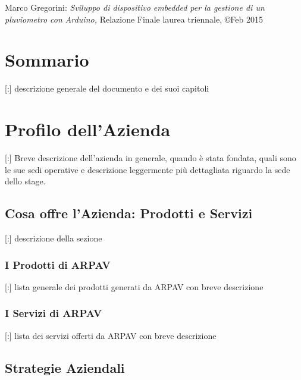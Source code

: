 \documentclass[11pt]{book}              %
\begin{document}
\newpage
\thispagestyle{empty}
\vspace*{\fill}

Marco Gregorini: \textit{Sviluppo di dispositivo embedded per la gestione di un pluviometro con Arduino,} Relazione Finale laurea triennale, \copyright Feb 2015

\newpage

\chapter{Sommario}
[:] descrizione generale del documento e dei suoi capitoli
                          

\newpage
\thispagestyle{empty}

\tableofcontents    

\newpage
\thispagestyle{empty}

                  
\mainmatter       
  

\chapter{Profilo dell'Azienda}
\flushleft
\thispagestyle{fancy} 

[:] Breve descrizione dell'azienda in generale, quando è stata fondata, quali sono le sue sedi operative e descrizione leggermente più dettagliata riguardo la sede dello stage.

\section{Cosa offre l'Azienda: Prodotti e Servizi}

[:] descrizione della sezione

\subsection{I Prodotti di ARPAV}

[:] lista generale dei prodotti generati da ARPAV con breve descrizione

\subsection{I Servizi di ARPAV}

[:] lista dei servizi offerti da ARPAV con breve descrizione

\section{Strategie Aziendali}
\end{document}
